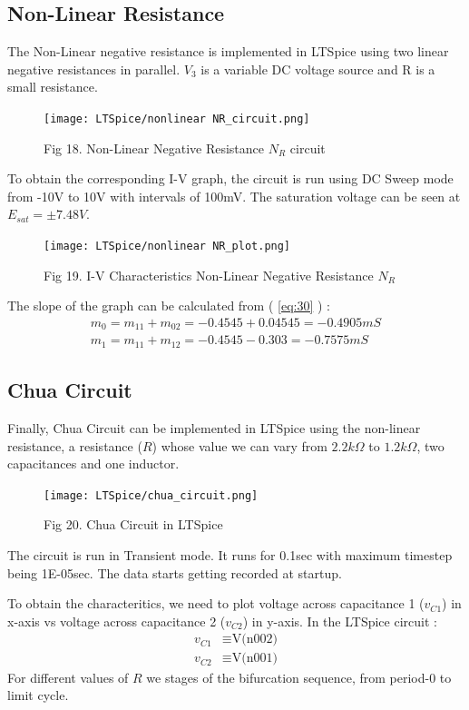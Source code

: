 \documentclass[12pt]{article}
\newcommand*{\myref}[1]{%
  \begingroup
    \hypersetup{
      linkcolor=linkequation,
      linkbordercolor=linkequation,
    }%
    \ref{#1}%
  \endgroup
}
\begin{document}
\subsection{Non-Linear Resistance}
The Non-Linear negative resistance is implemented in LTSpice using two linear negative resistances in parallel. $V_3$ is a variable DC voltage source and R is a small resistance. 
\begin{figure}[H]
	\centering
	\texttt{[image: LTSpice/nonlinear NR\_circuit.png]}
	\caption{Fig 18. Non-Linear Negative Resistance $N_R$ circuit}
\end{figure}
To obtain the corresponding I-V graph, the circuit is run using DC Sweep mode from -10V to 10V with intervals of 100mV. The saturation voltage can be seen at $E_{sat}=\pm 7.48V$. 
\begin{figure}[H]
	\centering
	\texttt{[image: LTSpice/nonlinear NR\_plot.png]}
	\caption{Fig 19. I-V Characteristics Non-Linear Negative Resistance $N_R$}
\end{figure}
The slope of the graph can be calculated from (\myref{eq:30}) :
\begin{align*}
	m_0=m_{11}+m_{02}=-0.4545+0.04545 =-0.4905 mS \\
	m_1=m_{11}+m_{12}=-0.4545-0.303= -0.7575mS
\end{align*}
\subsection{Chua Circuit}
Finally, Chua Circuit can be implemented in LTSpice using the non-linear resistance, a resistance ($R$) whose value we can vary from $2.2k\Omega$ to $1.2k\Omega$, two capacitances and one inductor. 
\begin{figure}[H]
	\centering
	\texttt{[image: LTSpice/chua\_circuit.png]}
	\caption{Fig 20. Chua Circuit in LTSpice}
\end{figure}
The circuit is run in Transient mode. It runs for 0.1sec with maximum timestep being 1E-05sec. The data starts getting recorded at startup. \linebreak

To obtain the characteritics, we need to plot voltage across capacitance 1 ($v_{C1}$) in x-axis vs voltage across capacitance 2 ($v_{C2}$) in y-axis. In the LTSpice circuit :
\begin{align*}
	v_{C1} &\equiv \text{V(n002)} \\
	v_{C2} &\equiv \text{V(n001)}
\end{align*}
For different values of $R$ we stages of the bifurcation sequence, from period-0 to limit cycle. \linebreak
\end{document}
